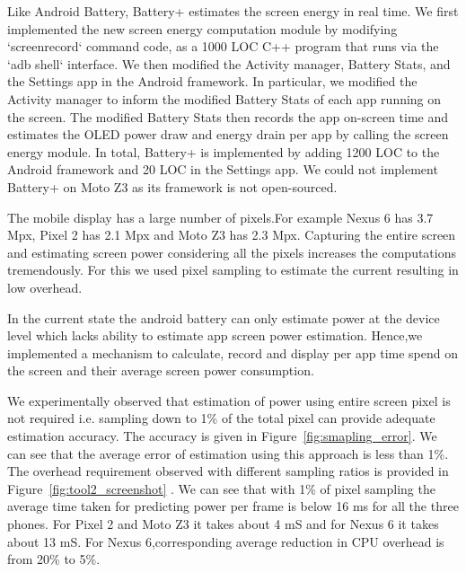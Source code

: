Like Android Battery, Battery+ estimates the screen energy in real
time. 
We first implemented the new screen energy computation module 
by modifying {\small `screenrecord`} command code,
as a 1000 LOC C++ program that runs via the {`adb shell`} interface.
We then modified the Activity manager, Battery Stats, and the Settings app
in the Android framework.
In particular, we modified the Activity manager to
inform the modified Battery Stats     of each app running on the screen.
The modified Battery Stats then records the app on-screen time and estimates
the OLED power draw and energy drain per app by calling the screen energy module.
In total, Battery+ is implemented by adding 1200 LOC to
the Android framework and 20 LOC in the Settings app.
We could not implement Battery+ on Moto Z3 as
its framework is not open-sourced.


The mobile display has a large number of pixels.For example Nexus 6
has 3.7 Mpx, Pixel 2 has 2.1 Mpx and Moto Z3 has 2.3 Mpx.
Capturing the entire screen and estimating screen power considering all
the pixels increases the computations tremendously.
For this we used pixel sampling to estimate the current resulting in low
overhead.

In the current state the android battery can only estimate power at the device
level which lacks ability to estimate  app screen power estimation.
Hence,we  implemented a mechanism to calculate, record and display per
app time spend on the screen and their average screen power consumption.

We experimentally observed that estimation of power using entire
screen pixel is not required i.e.  sampling down to 1\% of the total
pixel can provide adequate estimation accuracy.  The accuracy is given
in Figure~\ref{fig:smapling_error}.  We can see that the average error
of estimation using this approach is less than 1\%.  The overhead
requirement observed with different sampling ratios is provided in
Figure~\ref{fig:tool2_screenshot} . We can see that with 1\% of pixel
sampling the average time taken for predicting power per frame is
below 16 ms for all the three phones. For Pixel 2 and Moto Z3 it takes
about 4 mS and for Nexus 6 it takes about 13 mS. For Nexus
6,corresponding average reduction in CPU overhead is from 20\% to 5\%.


